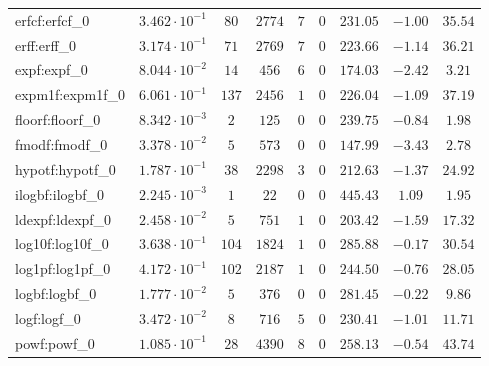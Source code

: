 \begin{tabular}{|l|c|c|c|c|c|c|c|c|}
erfcf:erfcf\_0               & $ 3.462 \cdot 10^{-1} $ & $ 80     $ & $ 2774  $ & $ 7   $ & $ 0   $ & $ 231.05      $ & $ -1.00   $ & $ 35.54   $ \\
erff:erff\_0                 & $ 3.174 \cdot 10^{-1} $ & $ 71     $ & $ 2769  $ & $ 7   $ & $ 0   $ & $ 223.66      $ & $ -1.14   $ & $ 36.21   $ \\
expf:expf\_0                 & $ 8.044 \cdot 10^{-2} $ & $ 14     $ & $ 456   $ & $ 6   $ & $ 0   $ & $ 174.03      $ & $ -2.42   $ & $ 3.21    $ \\
expm1f:expm1f\_0             & $ 6.061 \cdot 10^{-1} $ & $ 137    $ & $ 2456  $ & $ 1   $ & $ 0   $ & $ 226.04      $ & $ -1.09   $ & $ 37.19   $ \\
floorf:floorf\_0             & $ 8.342 \cdot 10^{-3} $ & $ 2      $ & $ 125   $ & $ 0   $ & $ 0   $ & $ 239.75      $ & $ -0.84   $ & $ 1.98    $ \\
fmodf:fmodf\_0               & $ 3.378 \cdot 10^{-2} $ & $ 5      $ & $ 573   $ & $ 0   $ & $ 0   $ & $ 147.99      $ & $ -3.43   $ & $ 2.78    $ \\
hypotf:hypotf\_0             & $ 1.787 \cdot 10^{-1} $ & $ 38     $ & $ 2298  $ & $ 3   $ & $ 0   $ & $ 212.63      $ & $ -1.37   $ & $ 24.92   $ \\
ilogbf:ilogbf\_0             & $ 2.245 \cdot 10^{-3} $ & $ 1      $ & $ 22    $ & $ 0   $ & $ 0   $ & $ 445.43      $ & $ 1.09    $ & $ 1.95    $ \\
ldexpf:ldexpf\_0             & $ 2.458 \cdot 10^{-2} $ & $ 5      $ & $ 751   $ & $ 1   $ & $ 0   $ & $ 203.42      $ & $ -1.59   $ & $ 17.32   $ \\
log10f:log10f\_0             & $ 3.638 \cdot 10^{-1} $ & $ 104    $ & $ 1824  $ & $ 1   $ & $ 0   $ & $ 285.88      $ & $ -0.17   $ & $ 30.54   $ \\
log1pf:log1pf\_0             & $ 4.172 \cdot 10^{-1} $ & $ 102    $ & $ 2187  $ & $ 1   $ & $ 0   $ & $ 244.50      $ & $ -0.76   $ & $ 28.05   $ \\
logbf:logbf\_0               & $ 1.777 \cdot 10^{-2} $ & $ 5      $ & $ 376   $ & $ 0   $ & $ 0   $ & $ 281.45      $ & $ -0.22   $ & $ 9.86    $ \\
logf:logf\_0                 & $ 3.472 \cdot 10^{-2} $ & $ 8      $ & $ 716   $ & $ 5   $ & $ 0   $ & $ 230.41      $ & $ -1.01   $ & $ 11.71   $ \\
powf:powf\_0                 & $ 1.085 \cdot 10^{-1} $ & $ 28     $ & $ 4390  $ & $ 8   $ & $ 0   $ & $ 258.13      $ & $ -0.54   $ & $ 43.74   $ \\

\end{tabular}
